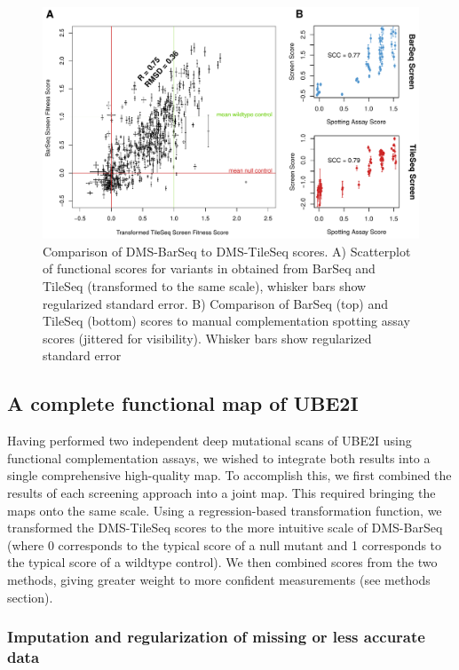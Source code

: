 \begin{figure}[h!]
	\centering
	\includegraphics[width=.9\textwidth]{img/barVtile.pdf}
	\caption{Comparison of DMS-BarSeq to DMS-TileSeq scores. A) Scatterplot of functional scores for variants in obtained from BarSeq and TileSeq (transformed to the same scale), whisker bars show regularized standard error. B) Comparison of BarSeq (top) and TileSeq (bottom) scores to manual complementation spotting assay scores (jittered for visibility). Whisker bars show regularized standard error}
	\label{fig:barVtile}
\end{figure}

\subsection{A complete functional map of UBE2I}

Having performed two independent deep mutational scans of UBE2I using functional complementation assays, we wished to integrate both results into a single comprehensive high-quality map. To accomplish this, we first combined the results of each screening approach into a joint map.  This required bringing the maps onto the same scale. Using a regression-based transformation function, we transformed the DMS-TileSeq scores to the more intuitive scale of DMS-BarSeq (where 0 corresponds to the typical score of a null mutant and 1 corresponds to the typical score of a wildtype control). We then combined scores from the two methods, giving greater weight to more confident measurements (see methods section).

\subsubsection{Imputation and regularization of missing or less accurate data}

